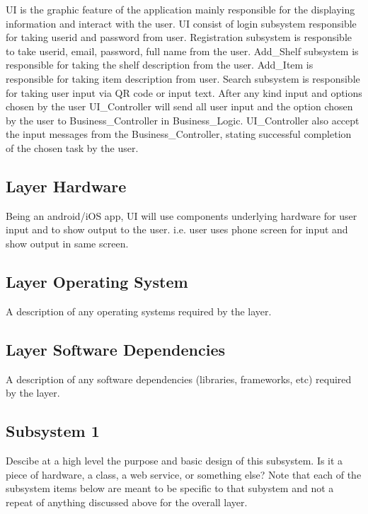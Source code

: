 UI is the graphic feature of the application mainly responsible for the displaying information and interact with the user. UI consist of login subsystem responsible for taking userid and password from user. Registration subsystem is responsible to take userid, email, password, full name from the user. Add\_Shelf subsystem is responsible for taking the shelf description from the user. Add\_Item is responsible for taking item description from user. Search subsystem is responsible for taking user input via QR code or input text. After any kind input and options chosen by the user UI\_Controller will send all user input and the option chosen by the user to Business\_Controller in Business\_Logic. UI\_Controller also accept the input messages from the Business\_Controller, stating successful completion of the chosen task by the user.

\subsection{Layer Hardware}
Being an android/iOS app, UI will use components underlying hardware for user input and to show output to the user. i.e. user uses phone screen for input and show output in same screen.

\subsection{Layer Operating System}
A description of any operating systems required by the layer.

\subsection{Layer Software Dependencies}
A description of any software dependencies (libraries, frameworks, etc) required by the layer.

\subsection{Subsystem 1}
Descibe at a high level the purpose and basic design of this subsystem. Is it a piece of hardware, a class, a web service, or something else? Note that each of the subsystem items below are meant to be specific to that subystem and not a repeat of anything discussed above for the overall layer.

